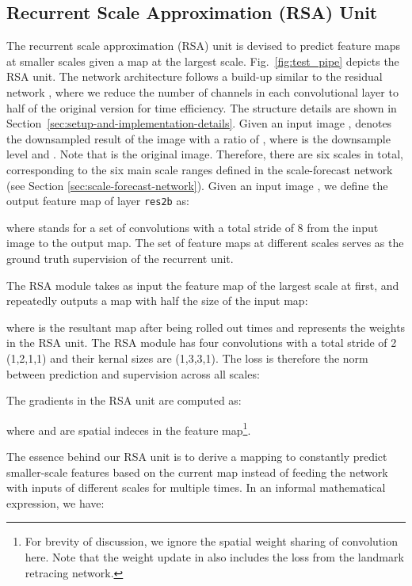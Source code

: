 \documentclass[10pt,twocolumn,letterpaper]{article}
\begin{document}
\subsection{Recurrent Scale Approximation (RSA) Unit}\label{sec:recurrent-scale-approximation-(rsa)-unit}
The recurrent scale approximation (RSA) unit is devised to predict feature maps at smaller scales given a map at the largest scale. Fig.~\ref{fig:test_pipe} depicts the RSA unit.
The network architecture follows a build-up similar to the residual network \cite{resNet}, where we reduce the number of channels in each convolutional layer to half of the original version for time efficiency. The structure details are shown in Section~\ref{sec:setup-and-implementation-details}.
Given an input image ,  denotes the downsampled result of the image with a ratio of , where  is the downsample level and . Note that  is the original image. Therefore, there are  six scales in total, corresponding to the six main scale ranges defined in the scale-forecast network (see Section \ref{sec:scale-forecast-network}).
Given an input image , we define the output feature map of layer \texttt{res2b} as:

where  stands for a set of convolutions with a total stride of 8 from the input image to the output map. The set of feature maps  at different scales serves as the ground truth supervision of the recurrent unit.

The RSA module  takes as input the feature map of the largest scale  at first,  and repeatedly outputs a map with half the size of the input map:

where  is the resultant map after being rolled out  times and  represents the weights in the RSA unit.
The RSA module has four convolutions with a total stride of 2 (1,2,1,1) and their kernal sizes are (1,3,3,1). The loss is therefore the  norm between prediction  and supervision  across all scales:

The gradients in the RSA unit are computed as:

where  and  are spatial  indeces in the feature map\footnote{For brevity of discussion, we ignore the spatial weight sharing of convolution here. Note that the weight update in  also includes the loss from the landmark retracing network. }.

The essence behind our RSA unit is to derive a mapping  to constantly predict smaller-scale features based on the current map instead of feeding the network with inputs of different scales for multiple times. In an informal mathematical expression, we have:
\end{document}
